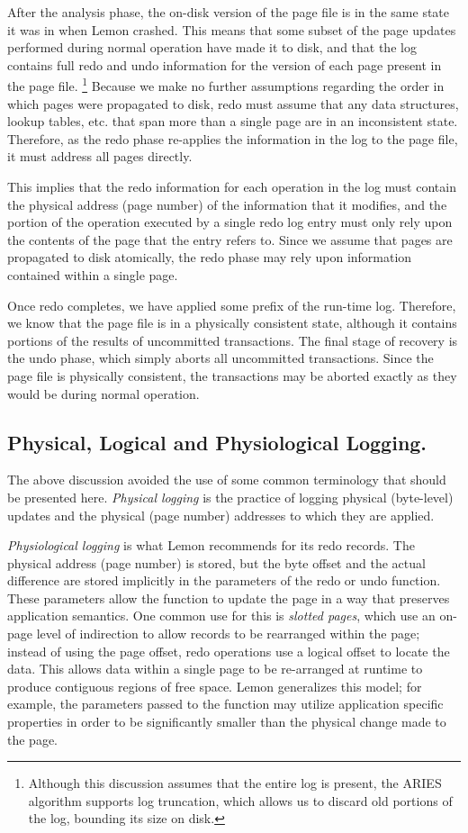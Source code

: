 \documentclass[letterpaper,twocolumn,english]{article}
\newcommand{\yad}{Lemon\xspace}
\begin{document}
After the analysis phase, the on-disk version of the page file
is in the same state it was in when \yad crashed. This means that
some subset of the page updates performed during normal operation
have made it to disk, and that the log contains full redo and undo
information for the version of each page present in the page file.%
\footnote{Although this discussion assumes that the entire log is present, the
ARIES algorithm supports log truncation, which allows us to discard
old portions of the log, bounding its size on disk.%
} Because we make no further assumptions regarding the order in which
pages were propagated to disk, redo must assume that any
data structures, lookup tables, etc. that span more than a single
page are in an inconsistent state. Therefore, as the redo phase re-applies
 the information in the log to the page file, it must address all pages directly. 

This implies that the redo information for each operation in the log
must contain the physical address (page number) of the information
that it modifies, and the portion of the operation executed by a single
redo log entry must only rely upon the contents of the page that the 
entry refers to. Since we assume that pages are propagated to disk
atomically, the redo phase may rely upon information contained within
a single page.

Once redo completes, we have applied some prefix of the run-time log.
Therefore, we know that the page file is in
a physically consistent state, although it contains portions of the
results of uncommitted transactions. The final stage of recovery is
the undo phase, which simply aborts all uncommitted transactions. Since
the page file is physically consistent, the transactions may be aborted
exactly as they would be during normal operation. 


\subsection{Physical, Logical and Physiological Logging.}

The above discussion avoided the use of some common terminology 
that should be presented here. {\em Physical logging } 
is the practice of logging physical (byte-level) updates
and the physical (page number) addresses to which they are applied.

{\em Physiological logging } is what \yad recommends for its redo 
records. The physical address (page number) is stored, but the byte offset
and the actual difference are stored implicitly in the parameters
of the redo or undo function. These parameters allow the function to 
update the page in a way that preserves application semantics.
One common use for this is {\em slotted pages}, which use an on-page level of 
indirection to allow records to be rearranged within the page; instead of using the page offset, redo 
operations use a logical offset to locate the data. This allows data within
a single page to be re-arranged at runtime to produce contiguous
regions of free space. \yad generalizes this model; for example, the parameters passed to the function may utilize application specific properties in order to be significantly smaller than the physical change made to the page.~\cite{physiological}
\end{document}
